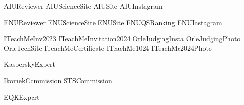 \renewcommand\ExhibitGroup{Judging}

{AIUReviewer}
{AIUScienceSite}
{AIUSite}
{AIUInstagram}

{ENUReviewer}
{ENUScienceSite}
{ENUSite}
{ENUQSRanking}
{ENUInstagram}

{ITeachMeInv2023}
{ITeachMeInvitation2024}
{OrleJudgingInsta}
{OrleJudgingPhoto}
{OrleTechSite}
{ITeachMeCertificate}
{ITeachMe1024}
{ITeachMe2024Photo}

{KasperskyExpert}

{IkomekCommission}
{STSCommission}

{EQKExpert}
